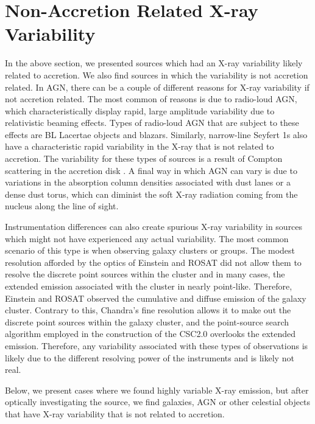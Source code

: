 \section{Non-Accretion Related X-ray Variability}

In the above section, we presented sources which had an X-ray variability likely related to accretion.
We also find sources in which the variability is not accretion related. 
In AGN, there can be a couple of different reasons for X-ray variability if not accretion related. 
The most common of reasons is due to radio-loud AGN, which characteristically display rapid, large amplitude variability due to relativistic beaming effects.
Types of radio-loud AGN that are subject to these effects are BL Lacertae objects and blazars.
Similarly, narrow-line Seyfert 1s also have a characteristic rapid variability in the X-ray that is not related to accretion.
The variability for these types of sources is a result of Compton scattering in the accretion disk \citep{mallick2018}.
A final way in which AGN can vary is due to variations in the absorption column densities associated with dust lanes or a dense dust torus, which can diminist the soft X-ray radiation coming from the nucleus along the line of sight.

Instrumentation differences can also create spurious X-ray variability in sources which might not have experienced any actual variability.
The most common scenario of this type is when observing galaxy clusters or groups.
The modest resolution afforded by the optics of Einstein and ROSAT did not allow them to resolve the discrete point sources within the cluster and in many cases, the extended emission associated with the cluster in nearly point-like.
Therefore, Einstein and ROSAT observed the cumulative and diffuse emission of the galaxy cluster.
Contrary to this, Chandra's fine resolution allows it to make out the discrete point sources within the galaxy cluster, and the point-source search algorithm employed in the construction of the CSC2.0 overlooks the extended emission.
Therefore, any variability associated with these types of observations is likely due to the different resolving power of the instruments and is likely not real.

Below, we present cases where we found highly variable X-ray emission, but after optically investigating the source, we find galaxies, AGN or other celestial objects that have X-ray variability that is not related to accretion.



